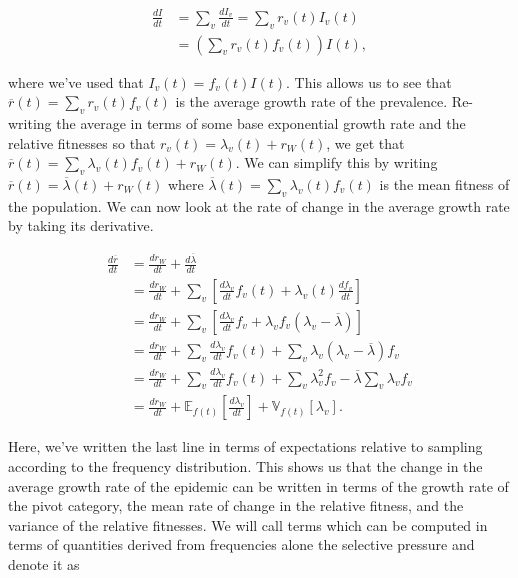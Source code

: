 \documentclass[11pt,oneside,letterpaper]{article}
\newcommand{\Expect}{\mathbb{E}}
\newcommand{\Var}{\mathbb{V}}
\newcommand{\wt}{W}
\begin{document}
\begin{align*}
    \frac{d I}{d t} &= \sum_{v} \frac{d I_{v}}{d t} =  \sum_{v} r_{v}(t) I_{v}(t)\\
                    &= \left( \sum_{v} r_{v}(t) f_{v}(t) \right) I(t),
\end{align*}

where we've used that $I_{v}(t) = f_{v}(t) I(t)$.
This allows us to see that $\overline{r}(t) = \sum_{v} r_{v}(t) f_{v}(t)$ is the average growth rate of the prevalence.
Re-writing the average in terms of some base exponential growth rate and the relative fitnesses so that $r_{v}(t) = \lambda_{v}(t) + r_\wt(t)$, we get that $\overline{r}(t) = \sum_{v} \lambda_{v}(t)f_{v}(t) + r_\wt(t)$.
We can simplify this by writing $\overline{r}(t) = \overline{\lambda}(t) + r_\wt(t)$ where $\overline{\lambda}(t) = \sum_{v} \lambda_{v}(t)f_{v}(t)$ is the mean fitness of the population.
We can now look at the rate of change in the average growth rate by taking its derivative.

\begin{align*}
    \frac{d \overline{r}}{d t} &= \frac{d r_{\wt}}{d t} + \frac{d \overline{\lambda}}{d t} \\
                               &= \frac{d r_{\wt}}{d t} + \sum_{v} \left[\frac{d \lambda_v}{d t} f_{v}(t) + \lambda_{v}(t) \frac{d f_{v}}{d t} \right]\\
                               &= \frac{d r_{\wt}}{d t} + \sum_{v} \left[\frac{d \lambda_v}{d t} f_{v} + \lambda_{v} f_{v} (\lambda_{v} - \overline{\lambda})  \right]\\
                               &= \frac{d r_{\wt}}{dt} + \sum_{v} \frac{d \lambda_v}{d t} f_{v}(t) + \sum_{v} \lambda_{v} (\lambda_{v} - \overline{\lambda}) f_{v}\\
                               &= \frac{d r_{\wt}}{dt} + \sum_{v} \frac{d \lambda_v}{d t} f_{v}(t) + \sum_{v} \lambda_{v}^{2} f_{v} - \overline{\lambda}\sum_{v} \lambda_{v} f_{v}\\
                               &= \frac{d r_{\wt}}{d t} + \Expect_{f(t)}\left[ \frac{d \lambda_v}{d t}\right] +  \Var_{f(t)}[\lambda_{v}].
\end{align*}

Here, we've written the last line in terms of expectations relative to sampling according to the frequency distribution.
This shows us that the change in the average growth rate of the epidemic can be written in terms of the growth rate of the pivot category, the mean rate of change in the relative fitness, and the variance of the relative fitnesses.
We will call terms which can be computed in terms of quantities derived from frequencies alone the selective pressure and denote it as
\end{document}
